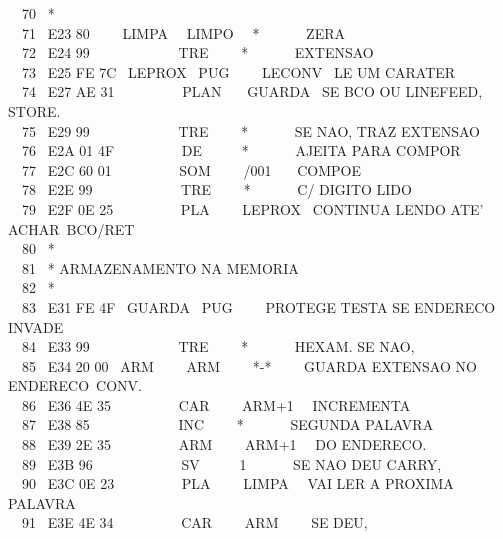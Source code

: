 \documentclass[a4paper,12pt]{article}
\begin{document}
\noindent \ \ 70 \ *\\
\phantom \ \ 71 \ E23 80 \ \ \ \ LIMPA \ \ LIMPO \ \ * \ \ \ \ \ \ ZERA\\
\phantom \ \ 72 \ E24 99 \ \ \ \ \ \ \ \ \ \ \ \ TRE \ \ \ \ * \ \ \ \ \ \ EXTENSAO\\
\phantom \ \ 73 \ E25 FE 7C \ LEPROX \ PUG \ \ \ \ LECONV \ LE UM CARATER\\
\phantom \ \ 74 \ E27 AE 31 \ \ \ \ \ \ \ \ \ PLAN \ \ \ GUARDA \ SE BCO OU LINEFEED, STORE.\\
\phantom \ \ 75 \ E29 99 \ \ \ \ \ \ \ \ \ \ \ \ TRE \ \ \ \ * \ \ \ \ \ \ SE NAO, TRAZ EXTENSAO\\
\phantom \ \ 76 \ E2A 01 4F \ \ \ \ \ \ \ \ \ DE \ \ \ \ \ * \ \ \ \ \ \ AJEITA PARA COMPOR\\
\phantom \ \ 77 \ E2C 60 01 \ \ \ \ \ \ \ \ \ SOM \ \ \ \ /001 \ \ \ COMPOE\\
\phantom \ \ 78 \ E2E 99 \ \ \ \ \ \ \ \ \ \ \ \ TRE \ \ \ \ * \ \ \ \ \ \ C/ DIGITO LIDO\\
\phantom \ \ 79 \ E2F 0E 25 \ \ \ \ \ \ \ \ \ PLA \ \ \ \ LEPROX \ CONTINUA LENDO ATE' ACHAR\,\,\,BCO/RET\\
\phantom \ \ 80 \ *\\
\phantom \ \ 81 \ * ARMAZENAMENTO NA MEMORIA\\
\phantom \ \ 82 \ *\\
\phantom \ \ 83 \ E31 FE 4F \ GUARDA \ PUG \ \ \ \ PROTEGE TESTA SE ENDERECO INVADE\\
\phantom \ \ 84 \ E33 99 \ \ \ \ \ \ \ \ \ \ \ \ TRE \ \ \ \ * \ \ \ \ \ \ HEXAM. SE NAO,\\
\phantom \ \ 85 \ E34 20 00 \ ARM \ \ \ \ ARM \ \ \ \ *-* \ \ \ \ GUARDA EXTENSAO NO ENDERECO\,\,\,CONV.\\
\phantom \ \ 86 \ E36 4E 35 \ \ \ \ \ \ \ \ \ CAR \ \ \ \ ARM+1 \ \ INCREMENTA\\
\phantom \ \ 87 \ E38 85 \ \ \ \ \ \ \ \ \ \ \ \ INC \ \ \ \ * \ \ \ \ \ \ SEGUNDA PALAVRA\\
\phantom \ \ 88 \ E39 2E 35 \ \ \ \ \ \ \ \ \ ARM \ \ \ \ ARM+1 \ \ DO ENDERECO.\\
\phantom \ \ 89 \ E3B 96 \ \ \ \ \ \ \ \ \ \ \ \ SV \ \ \ \ \ 1 \ \ \ \ \ \ SE NAO DEU CARRY,\\
\phantom \ \ 90 \ E3C 0E 23 \ \ \ \ \ \ \ \ \ PLA \ \ \ \ LIMPA \ \ VAI LER A PROXIMA PALAVRA\\
\phantom \ \ 91 \ E3E 4E 34 \ \ \ \ \ \ \ \ \ CAR \ \ \ \ ARM \ \ \ \ SE DEU,\\
\end{document}
